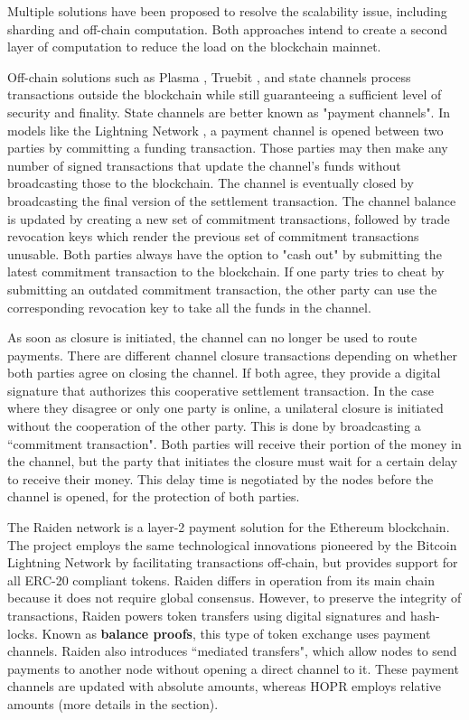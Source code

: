 Multiple solutions have been proposed to resolve the scalability issue, including sharding and off-chain computation. Both approaches intend to create a second layer of computation to reduce the load on the blockchain mainnet.

Off-chain solutions such as Plasma \cite{plasma}, Truebit \cite{truebit}, and state channels process transactions outside the blockchain while still guaranteeing a sufficient level of security and finality. State channels are better known as "payment channels". In models like the Lightning Network \cite{lightningnetwork}, a payment channel is opened between two parties by committing a funding transaction. Those parties may then make any number of signed transactions that update the channel's funds without broadcasting those to the blockchain. The channel is eventually closed by broadcasting the final version of the settlement transaction. The channel balance is updated by creating a new set of commitment transactions, followed by trade revocation keys which render the previous set of commitment transactions unusable. Both parties always have the option to "cash out" by submitting the latest commitment transaction to the blockchain. If one party tries to cheat by submitting an outdated commitment transaction, the other party can use the corresponding revocation key to take all the funds in the channel.

As soon as closure is initiated, the channel can no longer be used to route payments. There are different channel closure transactions depending on whether both parties agree on closing the channel. If both agree, they provide a digital signature that authorizes this cooperative settlement transaction. In the case where they disagree or only one party is online, a unilateral closure is initiated without the cooperation of the other party. This is done by broadcasting a ``commitment transaction". Both parties will receive their portion of the money in the channel, but the party that initiates the closure must wait for a certain delay to receive their money. This delay time is negotiated by the nodes before the channel is opened, for the protection of both parties.

The Raiden network \cite{raiden} is a layer-2 payment solution for the Ethereum blockchain. The project employs the same technological innovations pioneered by the Bitcoin Lightning Network by facilitating transactions off-chain, but provides support for all ERC-20 compliant tokens. Raiden differs in operation from its main chain because it does not require global consensus. However, to preserve the integrity of transactions, Raiden powers token transfers using digital signatures and hash-locks. Known as \textbf{balance proofs}, this type of token exchange uses payment channels. Raiden also introduces ``mediated transfers", which allow nodes to send payments to another node without opening a direct channel to it. These payment channels are updated with absolute amounts, whereas HOPR employs relative amounts (more details in the  section).

